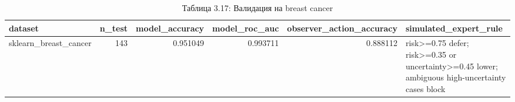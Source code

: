 \begin{table}[htbp]
\caption{Таблица 3.17: Валидация на breast cancer}
\label{tab:3_17}
\begin{tabular}{lrrrrl}
\toprule
dataset & n\_test & model\_accuracy & model\_roc\_auc & observer\_action\_accuracy & simulated\_expert\_rule \\
\midrule
sklearn\_breast\_cancer & 143 & 0.951049 & 0.993711 & 0.888112 & risk>=0.75 defer; risk>=0.35 or uncertainty>=0.45 lower; ambiguous high-uncertainty cases block \\
\bottomrule
\end{tabular}
\end{table}
